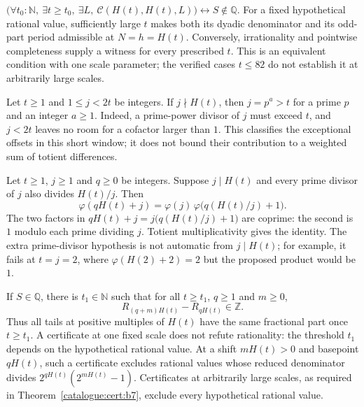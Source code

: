 \begin{thm}\label{catalogue:cert:b3}
$\big(\forall t_0:\mathbb{N},\ \exists t\ge t_0,\ \exists L,\ \mathcal{C}({H}(t), {H}(t), L)\big) \leftrightarrow S\notin\mathbb Q$. For a fixed hypothetical rational value, sufficiently large $t$ makes both its dyadic denominator and its odd-part period admissible at $N=h={H}(t)$. Conversely, irrationality and pointwise completeness supply a witness for every prescribed $t$. This is an equivalent condition with one scale parameter; the verified cases $t\le82$ do not establish it at arbitrarily large scales.
\end{thm}

\begin{lem}\label{catalogue:cert:b4}
Let $t\ge1$ and $1\le j<2t$ be integers. If $j\nmid H(t)$, then
$j=p^a>t$ for a prime $p$ and an integer $a\ge1$. Indeed, a prime-power
divisor of $j$ must exceed $t$, and $j<2t$ leaves no room for a
cofactor larger than $1$. This classifies the exceptional offsets in
this short window; it does not bound their contribution to a weighted
sum of totient differences.

\end{lem}

\begin{prop}\label{catalogue:cert:b5}
Let $t\ge1$, $j\ge1$ and $q\ge0$ be integers. Suppose $j\mid H(t)$
and every prime divisor of $j$ also divides $H(t)/j$. Then
\[
 \varphi(qH(t)+j)=\varphi(j)\,
                 \varphi\bigl(q(H(t)/j)+1\bigr).
\]
The two factors in $qH(t)+j=j\bigl(q(H(t)/j)+1\bigr)$ are coprime:
the second is $1$ modulo each prime dividing $j$. Totient
multiplicativity gives the identity. The extra prime-divisor hypothesis
is not automatic from $j\mid H(t)$; for example, it fails at $t=j=2$,
where $\varphi(H(2)+2)=2$ but the proposed product would be $1$.

\end{prop}

\begin{thm}\label{catalogue:cert:b6}
If $S\in\mathbb Q$, there is $t_1\in\mathbb N$ such that for all
$t\ge t_1$, $q\ge1$ and $m\ge0$,
\[
 R_{(q+m)H(t)}-R_{qH(t)}\in\mathbb Z.
\]
Thus all tails at positive multiples of $H(t)$ have the same fractional
part once $t\ge t_1$. A certificate at one fixed scale does not refute
rationality: the threshold $t_1$ depends on the hypothetical rational
value. At a shift $mH(t)>0$ and basepoint $qH(t)$, such a certificate
excludes rational values whose reduced denominator divides
$2^{qH(t)}(2^{mH(t)}-1)$. Certificates at arbitrarily large scales,
as required in Theorem~\ref{catalogue:cert:b7}, exclude every hypothetical
rational value.

\end{thm}

